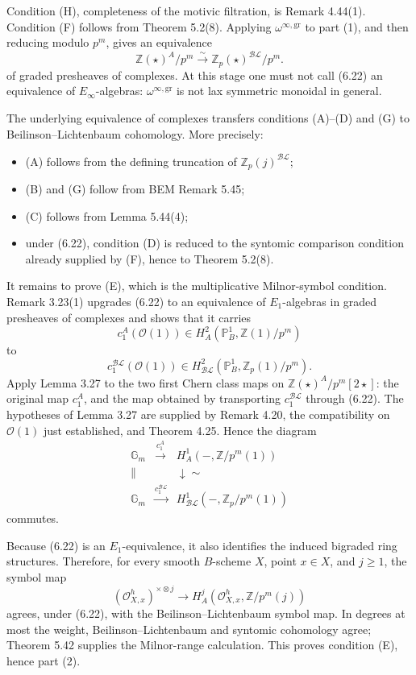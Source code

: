 \documentclass[11pt,a4paper]{article}
\newcommand{\Z}{\mathbb Z}
\newcommand{\Gm}{\mathbb G_m}
\newcommand{\Pone}{\mathbb P^1}
\newcommand{\BL}{\mathcal{BL}}
\newcommand{\1}{\mathbf 1}
\newcommand{\calO}{\mathcal O}
\theoremstyle{bemstyle}
\theoremstyle{definition}
\begin{document}
Condition (H), completeness of the motivic filtration, is Remark 4.44(1). Condition (F) follows from Theorem 5.2(8). Applying \(\omega^{\infty,\mathrm{gr}}\) to part (1), and then reducing modulo \(p^m\), gives an equivalence
\[
       \Z(\star)^A/p^m \xrightarrow{\sim} \Z_p(\star)^{\BL}/p^m. \tag{6.22}
\]
of graded presheaves of complexes. At this stage one must not call (6.22) an equivalence of \(E_\infty\)-algebras: \(\omega^{\infty,\mathrm{gr}}\) is not lax symmetric monoidal in general.

The underlying equivalence of complexes transfers conditions (A)--(D) and (G) to Beilinson--Lichtenbaum cohomology. More precisely:
\begin{itemize}
  \item (A) follows from the defining truncation of \(\Z_p(j)^{\BL}\);
  \item (B) and (G) follow from BEM Remark 5.45;
  \item (C) follows from Lemma 5.44(4);
  \item under (6.22), condition (D) is reduced to the syntomic comparison condition already supplied by (F), hence to Theorem 5.2(8).
\end{itemize}

It remains to prove (E), which is the multiplicative Milnor-symbol condition. Remark 3.23(1) upgrades (6.22) to an equivalence of \(E_1\)-algebras in graded presheaves of complexes and shows that it carries
\[
       c^A_1(\calO(1))\in H_A^2(\Pone_B,\Z(1)/p^m)
\]
to
\[
       c^{\BL}_1(\calO(1))\in H_{\BL}^2(\Pone_B,\Z_p(1)/p^m).
\]
Apply Lemma 3.27 to the two first Chern class maps on \(\Z(\star)^A/p^m[2\star]\): the original map \(c_1^A\), and the map obtained by transporting \(c_1^{\BL}\) through (6.22). The hypotheses of Lemma 3.27 are supplied by Remark 4.20, the compatibility on \(\calO(1)\) just established, and Theorem 4.25. Hence the diagram
\[
  \begin{array}{ccc}
       \Gm & \xrightarrow{c^A_1} & H_A^1(-,\Z/p^m(1)) \\
       \| & & \downarrow\scriptstyle{\sim} \\
       \Gm & \xrightarrow{c^{\BL}_1} & H_{\BL}^1(-,\Z_p/p^m(1))
  \end{array}
\]
commutes.

Because (6.22) is an \(E_1\)-equivalence, it also identifies the induced bigraded ring structures. Therefore, for every smooth \(B\)-scheme \(X\), point \(x\in X\), and \(j\geq1\), the symbol map
\[
       (\calO^h_{X,x})^{\times\otimes j}
       \longrightarrow
       H_A^j(\calO^h_{X,x},\Z/p^m(j))
\]
agrees, under (6.22), with the Beilinson--Lichtenbaum symbol map. In degrees at most the weight, Beilinson--Lichtenbaum and syntomic cohomology agree; Theorem 5.42 supplies the Milnor-range calculation. This proves condition (E), hence part (2).
\end{document}
